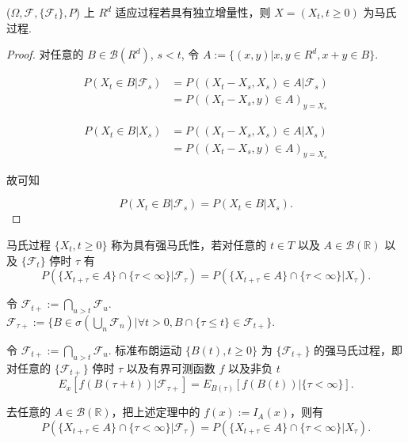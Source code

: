\documentclass[lang=cn,10pt,thmcnt=section]{elegantbook}
\begin{document}
\begin{theorem}
	($\Omega, \mathcal{F}, \{\mathcal{F}_t\}, P$) 上 $R^d$ 适应过程若具有独立增量性，则 $X = (X_t, t \geq 0)$ 为马氏过程.
\end{theorem}
\begin{proof}
	对任意的 $B \in \mathcal{B}(R^d)$, $s < t$, 令 $A := \{(x, y) | x, y \in R^d, x + y \in B\}$.

\begin{align*}
P(X_t \in B | \mathcal{F}_s) &= P((X_t - X_s, X_s) \in A | \mathcal{F}_s) \\
&= P((X_t - X_s, y) \in A)_{y = X_s}
\end{align*}

\begin{align*}
P(X_t \in B | X_s) &= P((X_t - X_s, X_s) \in A | X_s) \\
&= P((X_t - X_s, y) \in A)_{y = X_s}
\end{align*}

故可知

\[ P(X_t \in B | \mathcal{F}_s) = P(X_t \in B | X_s). \]

\end{proof}
\begin{definition}
	马氏过程 $\{X_t, t \geq 0\}$ 称为具有强马氏性，若对任意的 $t \in T$ 以及 $A \in \mathcal{B}(\mathbb{R})$ 以及 $\{\mathcal{F}_t\}$ 停时 $\tau$ 有
\[ P(\{X_{t+\tau} \in A\} \cap \{\tau < \infty\} | \mathcal{F}_\tau) = P(\{X_{t+\tau} \in A\} \cap \{\tau < \infty\} | X_\tau). \]

\end{definition}

令 $\mathcal{F}_{t+} := \bigcap_{u > t} \mathcal{F}_u$.\\
$\mathcal{F}_{\tau+} := \{B \in \sigma(\bigcup_n \mathcal{F}_n) | \forall t > 0, B \cap \{\tau \leq t\} \in \mathcal{F}_{t+}\}$.

\begin{theorem}
	令 $\mathcal{F}_{t+} := \bigcap_{u > t} \mathcal{F}_u$. 标准布朗运动 $\{B(t), t \geq 0\}$ 为 $\{\mathcal{F}_{t+}\}$ 的强马氏过程，即对任意的 $\{\mathcal{F}_{t+}\}$ 停时 $\tau$ 以及有界可测函数 $f$ 以及非负 $t$
\[ E_x[f(B(\tau + t)) | \mathcal{F}_{\tau+}] = E_{B(\tau)}[f(B(t)) | \{\tau < \infty\}]. \]

\end{theorem}
\begin{remark}
	去任意的 $A \in \mathcal{B}(\mathbb{R})$，把上述定理中的 $f(x) := I_A(x)$，则有
\[ P(\{X_{t+\tau} \in A\} \cap \{\tau < \infty\} | \mathcal{F}_\tau) = P(\{X_{t+\tau} \in A\} \cap \{\tau < \infty\} | X_\tau). \]

\end{remark}
\end{document}
